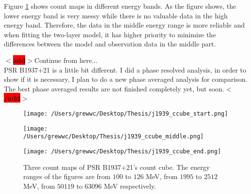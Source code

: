 \documentclass[12pt]{report}
\newcommand{\add}[1]{
  $<$\colorbox{red}{\textbf{add}}$>$#1$<$\colorbox{red}{\textbf{/add}}$>$
}
\begin{document}
          Figure \ref{fig: j1939_count_cube} shows count maps in different energy bands. As 
          the figure shows, the lower energy band is very messy while there is no valuable  
          data in the high energy band. Therefore, the data in the middle energy range is 
          more reliable and when fitting the two-layer model, it has higher priority to 
          minimize the differences between the model and observation data in the middle part.

          \add{Continue from here... \\
            PSR B1937+21 is a little bit different. I did a phase resolved analysis, 
            in order to show if it is necessary, I plan to do a new phase averaged analysis 
            for comparison. The best phase averaged results are not finished completely yet, 
            but soon.}
          \begin{figure}[!ht]
            \begin{minipage}{0.32\textwidth}
              \begin{center} 
                \texttt{[image: /Users/grewwc/Desktop/Thesis/j1939\_ccube\_start.png]}
              \end{center}
            \end{minipage}
            \begin{minipage}{0.32\textwidth}
              \begin{center}
                \texttt{[image: /Users/grewwc/Desktop/Thesis/j1939\_ccube\_middle.png]}
              \end{center}
            \end{minipage}
            \begin{minipage}{0.32\textwidth}
              \begin{center}
              \texttt{[image: /Users/grewwc/Desktop/Thesis/j1939\_ccube\_end.png]}
              \end{center}
            \end{minipage}
            \caption{Three count maps of PSR B1937+21's count cube. The energy ranges of the 
              figures are from $100$ to $126$ MeV, from $1995$ to $2512$ MeV, from $50119$ to
              $63096$ MeV respectively.}
            \label{fig: j1939_count_cube}
          \end{figure}
\end{document}
